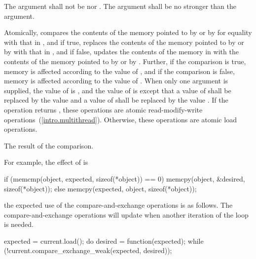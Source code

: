 \begin{itemdescr}
\pnum
\requires The  argument shall not be  nor
. The  argument shall be no stronger than the
 argument.

\pnum
\effects Atomically, compares the contents of the memory pointed to by  or by 
for equality with that in , and if true, replaces the contents of the memory pointed to
by  or by  with that in , and if false, updates the
contents of the memory in  with the contents of the memory pointed to by  or by
. Further, if the comparison is true, memory is affected according to the
value of , and if the comparison is false, memory is affected according
to the value of . When only one  argument is
supplied, the value of  is , and the value of
 is  except that a value of 
shall be replaced by the value  and a value of
 shall be replaced by the value
. If the operation returns , these
operations are atomic read-modify-write
operations~(\ref{intro.multithread}). Otherwise, these operations are atomic load operations.

\pnum
\returns The result of the comparison.

\pnum
\begin{note} For example, the effect of
 is
\begin{codeblock}
if (memcmp(object, expected, sizeof(*object)) == 0)
  memcpy(object, &desired, sizeof(*object));
else
  memcpy(expected, object, sizeof(*object));
\end{codeblock}
\end{note}
\begin{example} the expected use of the compare-and-exchange operations is as follows. The
compare-and-exchange operations will update  when another iteration of
the loop is needed.
\begin{codeblock}
expected = current.load();
do {
  desired = function(expected);
} while (!current.compare_exchange_weak(expected, desired));
\end{codeblock}
\end{example}


\end{itemdescr}
